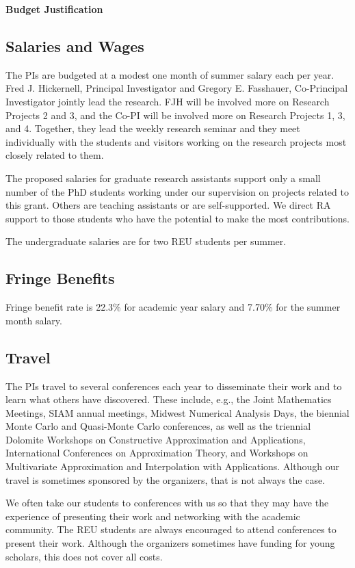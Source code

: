 \documentclass[11pt]{NSFamsart}
\begin{document}

\centerline{\textbf{\Large Budget Justification}}

\subsection*{Salaries and Wages}

The PIs are budgeted at a modest one month of summer salary each per year.  Fred J. Hickernell, Principal Investigator and Gregory E. Fasshauer, Co-Principal Investigator jointly lead the research.  FJH will be involved more on Research Projects 2 and 3, and the Co-PI will be involved more on Research Projects 1, 3, and 4.  Together, they lead the weekly research seminar and they meet individually with the students and visitors working on the research projects most closely related to them.

The proposed salaries for graduate research assistants support only a small number of the PhD students working under our supervision on projects related to this grant.  Others are teaching assistants or are self-supported.  We direct RA support to those students who have the potential to make the most contributions.

The undergraduate salaries are for two REU students per summer.

\subsection*{Fringe Benefits}
Fringe benefit rate is 22.3\% for academic year salary and 7.70\% for the summer month
salary.

\subsection*{Travel}
The PIs travel to several conferences each year to disseminate their work and to learn what others have discovered.  These include, e.g., the Joint Mathematics Meetings, SIAM annual meetings, Midwest Numerical Analysis Days, the biennial Monte Carlo and Quasi-Monte Carlo conferences, as well as the triennial Dolomite Workshops on Constructive Approximation and Applications, International Conferences on Approximation Theory, and Workshops on Multivariate Approximation and Interpolation with Applications. Although our travel is sometimes sponsored by the organizers, that is not always the case.

We often take our students to conferences with us so that they may have the experience of presenting their work and networking with the academic community.  The REU students are always encouraged to attend conferences to present their work.  Although the organizers sometimes have funding for young scholars, this does not cover all costs.
\end{document}
